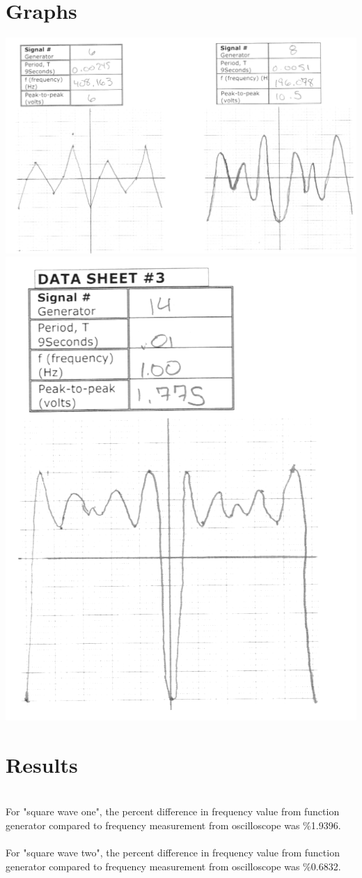 \documentclass{article}
\begin{document}
\section{Graphs}
\includegraphics{graphs1_crop}
\includegraphics{graphs2_crop}
\section{Results}\hfill\\
For "square wave one", the percent difference in frequency value from function generator compared to frequency measurement from oscilloscope was \%1.9396.\\ \\
For "square wave two", the percent difference in frequency value from function generator compared to frequency measurement from oscilloscope was \%0.6832.\\
\end{document}
